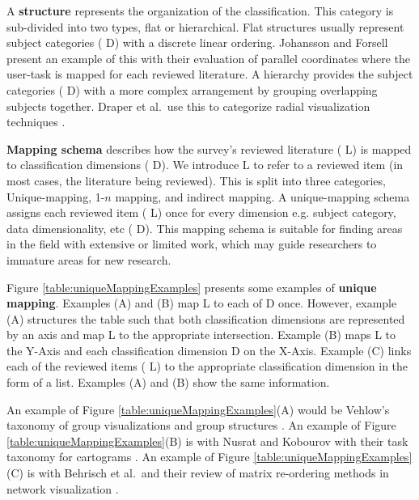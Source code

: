 A \textbf{structure} represents the organization of the classification. This category is sub-divided into two types, flat or hierarchical. Flat structures usually represent subject categories ({\color{red} D}) with a discrete linear ordering. Johansson and Forsell present an example of this with their evaluation of parallel coordinates \cite{johansson2016evaluation} where the user-task is mapped for each reviewed literature. A hierarchy provides the subject categories ({\color{red} D}) with a more complex arrangement by grouping overlapping subjects together. Draper et al.\ use this to categorize radial visualization techniques \cite{draper2009survey}.

\textbf{Mapping schema} describes how the survey's reviewed literature ({\color{blue} L}) is mapped to classification dimensions ({\color{red} D}). We introduce {\color{blue} L} to refer to a reviewed item (in most cases, the literature being reviewed). This is split into three categories, Unique-mapping, 1-$n$ mapping, and indirect mapping. A unique-mapping schema assigns each reviewed item ({\color{blue} L}) once for every dimension e.g. subject category, data dimensionality, etc ({\color{red} D}). This mapping schema is suitable for finding areas in the field with extensive or limited work, which may guide researchers to immature areas for new research.

Figure \ref{table:uniqueMappingExamples} presents some examples of \textbf{unique mapping}. Examples (A) and (B) map {\color{blue} L} to each of {\color{red} D} once. However, example (A) structures the table such that both classification dimensions are represented by an axis and map {\color{blue} L} to the appropriate intersection. Example (B) maps {\color{blue} L} to the Y-Axis and each classification dimension {\color{red} D} on the X-Axis. Example (C) links each of the reviewed items ({\color{blue} L}) to the appropriate classification dimension in the form of a list. Examples (A) and (B) show the same information. 


An example of Figure \ref{table:uniqueMappingExamples}(A) would be Vehlow's taxonomy of group visualizations and group structures \cite{vehlow2015state}. An example of Figure \ref{table:uniqueMappingExamples}(B) is with Nusrat and Kobourov with their task taxonomy for cartograms \cite{nusrat2015task}. An example of Figure \ref{table:uniqueMappingExamples}(C) is with Behrisch et al.\ and their review of matrix re-ordering methods in network visualization \cite{behrisch2016matrix}.

